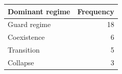 \begin{tabular}{lr}
\toprule
Dominant regime & Frequency \\
\midrule
Guard regime & 18 \\
Coexistence & 6 \\
Transition & 5 \\
Collapse & 3 \\
\bottomrule
\end{tabular}
